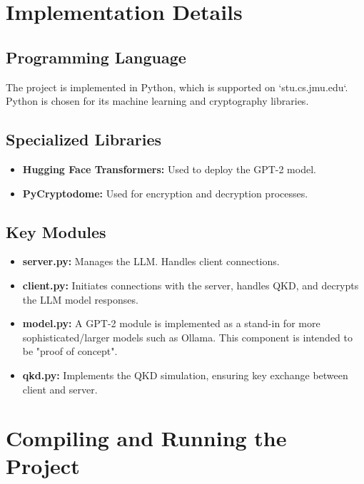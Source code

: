 \documentclass{article}
\begin{document}
\section{Implementation Details}

\subsection{Programming Language}
The project is implemented in Python, which is supported on `stu.cs.jmu.edu`. Python is chosen for its machine learning and cryptography libraries.

\subsection{Specialized Libraries}
\begin{itemize}
    \item \textbf{Hugging Face Transformers:} Used to deploy the GPT-2 model.
    \item \textbf{PyCryptodome:} Used for encryption and decryption processes.
\end{itemize}

\subsection{Key Modules}
\begin{itemize}
    \item \textbf{server.py:} Manages the LLM. Handles client connections.
    \item \textbf{client.py:} Initiates connections with the server, handles QKD, and decrypts the LLM model responses.
    \item \textbf{model.py:} A GPT-2 module is implemented as a stand-in for more sophisticated/larger models such as Ollama. This component is intended to be "proof of concept".
    \item \textbf{qkd.py:} Implements the QKD simulation, ensuring key exchange between client and server.
\end{itemize}






\section{Compiling and Running the Project}
\end{document}
